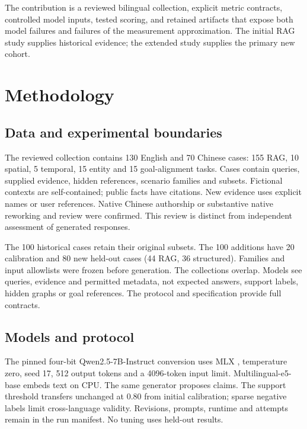 \documentclass{amsart}
\theoremstyle{definition}
\numberwithin{equation}{section}
\begin{document}
The contribution is a reviewed bilingual collection, explicit metric contracts, controlled model inputs, tested scoring, and retained artifacts that expose both model failures and failures of the measurement approximation. The initial RAG study supplies historical evidence; the extended study supplies the primary new cohort.

\section{Methodology}\label{sec:methodology}
\subsection{Data and experimental boundaries}
The reviewed collection contains 130 English and 70 Chinese cases: 155 RAG, 10 spatial, 5 temporal, 15 entity and 15 goal-alignment tasks. Cases contain queries, supplied evidence, hidden references, scenario families and subsets. Fictional contexts are self-contained; public facts have citations. New evidence uses explicit names or user references. Native Chinese authorship or substantive native reworking and review were confirmed. This review is distinct from independent assessment of generated responses.

The 100 historical cases retain their original subsets. The 100 additions have 20 calibration and 80 new held-out cases (44 RAG, 36 structured). Families and input allowlists were frozen before generation. The collections overlap. Models see queries, evidence and permitted metadata, not expected answers, support labels, hidden graphs or goal references. The protocol and specification provide full contracts.

\subsection{Models and protocol}
The pinned four-bit Qwen2.5-7B-Instruct conversion \cite{qwen} uses MLX \cite{mlx}, temperature zero, seed 17, 512 output tokens and a 4096-token input limit. Multilingual-e5-base \cite{e5} embeds text on CPU. The same generator proposes claims. The support threshold transfers unchanged at 0.80 from initial calibration; sparse negative labels limit cross-language validity. Revisions, prompts, runtime and attempts remain in the run manifest. No tuning uses held-out results.
\end{document}
